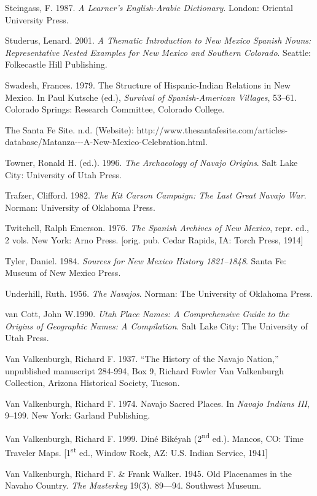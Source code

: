 Steingass, F.  1987.  \textit{A Learner’s English-Arabic Dictionary}.  London:  Oriental University Press.

Studerus, Lenard. 2001.  \textit{A Thematic Introduction to New Mexico Spanish Nouns: Representative Nested Examples for New Mexico and Southern Colorado}.  Seattle:  Folkecastle Hill Publishing.

Swadesh, Frances. 1979.  The Structure of Hispanic-Indian Relations in New Mexico.  In Paul Kutsche (ed.), \textit{Survival of Spanish-American Villages}, 53--61.  Colorado Springs:  Research Committee, Colorado College.

The Santa Fe Site. n.d.  (Website): http://www.thesantafesite.com/articles-database/Matanza-{}-{}-A-New-Mexico-Celebration.html.

Towner, Ronald H. (ed.). 1996. \textit{The Archaeology of Navajo Origins}.  Salt Lake City:  University of Utah Press.

Trafzer, Clifford. 1982.  \textit{The Kit Carson Campaign: The Last Great Navajo War}.  Norman:  University of Oklahoma Press.

Twitchell, Ralph Emerson. 1976.  \textit{The Spanish Archives of New Mexico}, repr. ed., 2 vols.  New York:  Arno Press.  [orig. pub. Cedar Rapids, IA:  Torch Press, 1914]

Tyler, Daniel. 1984.  \textit{Sources for New Mexico History 1821--1848}.  Santa Fe:  Museum of New Mexico Press.

Underhill, Ruth. 1956.  \textit{The Navajos}.  Norman:  The University of Oklahoma Press.

van Cott, John W.1990. \textit{Utah Place Names: A Comprehensive Guide to the Origins of Geographic Names: A Compilation}.  Salt Lake City:  The University of Utah Press.

Van Valkenburgh, Richard F.  1937.  “The History of the Navajo Nation,” unpublished manuscript 284-994, Box 9, Richard Fowler Van Valkenburgh Collection, Arizona Historical Society, Tucson.

Van Valkenburgh, Richard F.  1974.  Navajo Sacred Places.  In \textit{Navajo Indians III}, 9--199.  New York:  Garland Publishing.

Van Valkenburgh, Richard F.  1999.  Diné Bikéyah (2\textsuperscript{nd} ed.).  Mancos, CO:  Time Traveler Maps.  [1\textsuperscript{st} ed., Window Rock, AZ:  U.S. Indian Service, 1941]

Van Valkenburgh, Richard F. \& Frank Walker. 1945.  Old Placenames in the Navaho Country.  \textit{The Masterkey} 19(3). 89---94.  Southwest Museum.

